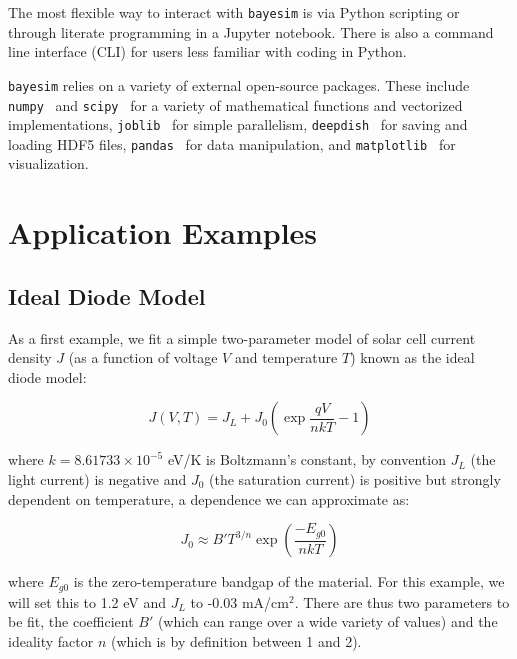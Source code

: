 \documentclass[aps,prl,amsmath,amssymb,superscriptaddress,notitlepage,groupedaddress]{revtex4-1}
\begin{document}
  The most flexible way to interact with \texttt{bayesim} is via Python scripting or through literate programming in a Jupyter notebook. There is also a command line interface (CLI) for users less familiar with coding in Python.

  \texttt{bayesim} relies on a variety of external open-source packages. These include \texttt{numpy}~\cite{numpy} and \texttt{scipy}~\cite{scipy} for a variety of mathematical functions and vectorized implementations, \texttt{joblib}~\cite{joblib} for simple parallelism, \texttt{deepdish}~\cite{deepdish} for saving and loading HDF5 files, \texttt{pandas}~\cite{pandas} for data manipulation, and \texttt{matplotlib}~\cite{mpl} for visualization.

\section*{Application Examples}
  \subsection{Ideal Diode Model}
    As a first example, we fit a simple two-parameter model of solar cell current density $J$ (as a function of voltage $V$ and temperature $T$) known as the ideal diode model:

    \begin{equation}
      J(V,T) = J_L+J_0\left(\exp{\frac{qV}{nkT}}-1\right)
      \label{ID_eqn}
    \end{equation}

    where $k=8.61733\times 10^{-5}$ eV/K is Boltzmann's constant, by convention $J_L$ (the light current) is negative and $J_0$ (the saturation current) is positive but strongly dependent on temperature, a dependence we can approximate as:

    \begin{equation}
      J_0 \approx B'T^{3/n}\exp{\left(\frac{-E_{g0}}{nkT}\right)}
    \end{equation}

    where $E_{g0}$ is the zero-temperature bandgap of the material. For this example, we will set this to 1.2 eV and $J_L$ to -0.03 mA/cm$^2$. There are thus two parameters to be fit, the coefficient $B'$ (which can range over a wide variety of values) and the ideality factor $n$ (which is by definition between 1 and 2).
\end{document}
